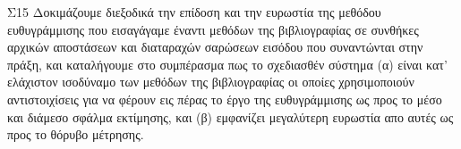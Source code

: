 \begin{bw_box}
\begin{customcontribution}{Σ15}
  \label{contribution:15}
  Δοκιμάζουμε διεξοδικά την επίδοση και την ευρωστία της μεθόδου ευθυγράμμισης
  που εισαγάγαμε έναντι μεθόδων της βιβλιογραφίας σε συνθήκες αρχικών
  αποστάσεων και διαταραχών σαρώσεων εισόδου που συναντώνται στην πράξη, και
  καταλήγουμε στο συμπέρασμα πως το σχεδιασθέν σύστημα (α) είναι κατ' ελάχιστον
  ισοδύναμο των μεθόδων της βιβλιογραφίας οι οποίες χρησιμοποιούν
  αντιστοιχίσεις για να φέρουν εις πέρας το έργο της ευθυγράμμισης ως προς το
  μέσο και διάμεσο σφάλμα εκτίμησης, και (β) εμφανίζει μεγαλύτερη ευρωστία απο
  αυτές ως προς το θόρυβο μέτρησης.
\end{customcontribution}
\end{bw_box}

